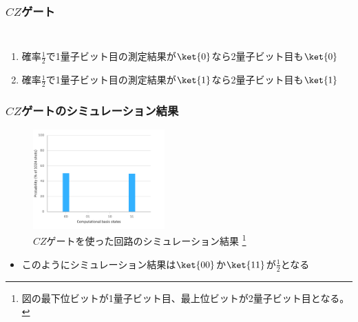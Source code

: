 \begin{frame}
  \frametitle{$CZ$ゲート}

  \begin{columns}
    \begin{column}{0.5\textwidth}
      \begin{figure}
        \centering
      \end{figure}
    \end{column}
    \begin{column}{0.5\textwidth}
    \end{column}
  \end{columns}


  \begin{enumerate}
    \item 確率$\frac{1}{2}$で1量子ビット目の測定結果が$\ket{0}$なら2量子ビット目も$\ket{0}$
    \item 確率$\frac{1}{2}$で1量子ビット目の測定結果が$\ket{1}$なら2量子ビット目も$\ket{1}$
  \end{enumerate}

\end{frame}

\begin{frame}
  \frametitle{$CZ$ゲートのシミュレーション結果}

  \begin{center}
    \begin{figure}
      \includegraphics[width=0.45\textwidth]{./img/cz_gate_histogram.pdf}
      \caption{%
        $CZ$ゲートを使った回路のシミュレーション結果%
        \footnote{図の最下位ビットが1量子ビット目、最上位ビットが2量子ビット目となる。}%
      }
    \end{figure}
  \end{center}
  \begin{itemize}
    \item このようにシミュレーション結果は$\ket{00}$か$\ket{11}$が$\frac{1}{2}$となる
  \end{itemize}
\end{frame}

